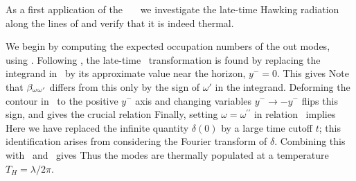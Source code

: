 
As a first application of the \Bog\ \Xm\ \bogxm\ we investigate the
late-time Hawking radiation along the lines of 
and verify that it is indeed thermal.

We begin by computing the expected occupation numbers of the out modes,
using \nvev.
Following \HawkEvap, the late-time \Bog\ transformation is
found by replacing the integrand in \inprod\ by its
approximate value near the horizon, $y^-=0$.
This gives
%
\eqn{}
%
Note that $\beta_{\omega\omega'}$ differs from this only by the sign of $\omega'$ in the
integrand.  Deforming the contour in \lbog\ to the positive $y^-$ axis and
changing variables $y^- \rightarrow -y^-$ flips this sign, and gives the
crucial relation
%
\eqn{}
%
Finally, setting $\omega=\omega^{\prime\prime}$ in relation \norma\ implies
%
\eqn{}
%
Here we have replaced the infinite quantity $\delta(0)$ by a large time
cutoff $t$; this identification arises from considering the Fourier
transform of $\delta$.  Combining this with \treln\ and \nvev\ gives
%
\eqn{}
%
Thus the modes are thermally populated at a temperature $T_H=\lambda/2\pi$.

